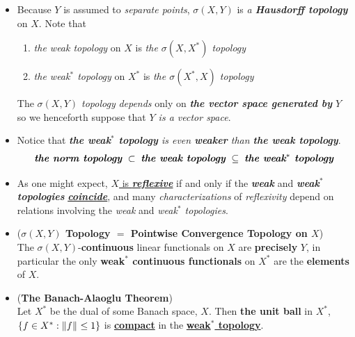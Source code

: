 \documentclass[11pt]{article}
\begin{document}
\begin{itemize}
\item \begin{remark}
Because $Y$ is assumed to \emph{separate points}, $\sigma(X, Y)$ is \emph{a \textbf{Hausdorff topology}} on $X$.  Note that
\begin{enumerate}
\item \emph{the weak topology} on $X$ is \emph{the $\sigma(X, X^{*})$ topology}
\item \emph{the weak$^{*}$ topology} on $X^{*}$ is \emph{the $\sigma(X^{*}, X)$ topology}
\end{enumerate}

The \emph{$\sigma(X, Y)$ topology} \emph{depends} only on \emph{\textbf{the vector space generated by }$Y$} so we henceforth suppose  that  \emph{$Y$ is a vector space}. 
\end{remark}


\item \begin{remark}
Notice that \emph{\textbf{the weak$^{*}$ topology} is even \textbf{weaker} than \textbf{the weak topology}}.
\begin{align*}
 \text{\emph{\textbf{the norm topology}}} \; \subset \; \text{\emph{\textbf{the weak topology}}} \; \subseteq \; \text{\emph{\textbf{the weak$^{*}$ topology}}}
\end{align*}
\end{remark}

\item \begin{remark}
As one might expect, \underline{$X$ is \emph{\textbf{reflexive}}} if and only if the \emph{\textbf{weak}} and \emph{\textbf{weak$^{*}$ topologies}} \underline{\emph{\textbf{coincide}}}, and many \emph{characterizations} of \emph{reflexivity} depend on relations involving the \emph{weak} and \emph{weak$^{*}$ topologies}.
\end{remark}

\item \begin{proposition} (\textbf{$\sigma(X, Y)$ Topology $=$ Pointwise Convergence Topology on $X$}) \citep{reed1980methods} \\
The $\sigma(X, Y)$-\textbf{continuous} linear functionals on $X$ are \textbf{precisely} $Y$, in particular the only \textbf{weak$^{*}$ continuous functionals} on $X^{*}$ are  the \textbf{elements} of $X$. 
\end{proposition}

\item \begin{theorem} (\textbf{The Banach-Alaoglu Theorem}) \citep{reed1980methods}\\
 Let $X^{*}$ be the dual of some Banach space, $X$. Then \textbf{the unit ball} in $X^{*}$, $\left\{f \in X^{*}: \left\|f\right\|_{}\le 1\right\}$ is \underline{\textbf{compact}} in the \underline{\textbf{weak$^{*}$ topology}}.
\end{theorem}


\end{itemize}
\end{document}
